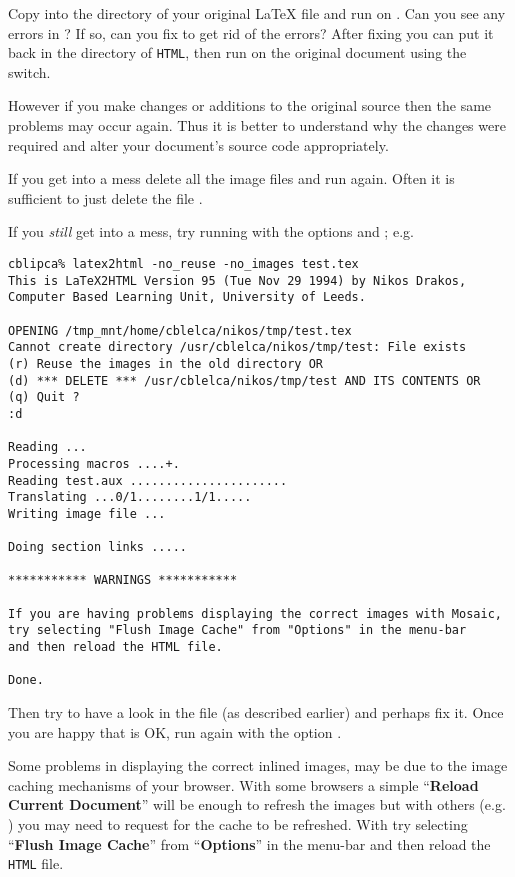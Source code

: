 \begin{htmllist}
Copy  into the directory
of your original \LaTeX{} file and run  on .
Can you see any errors in ?
If so, can you fix  to get rid of the errors?
After fixing 
you can put it back in the directory of \texttt{HTML},
then run \latextohtml{} on the original document
using the  switch.

However if you make changes or additions to the original source
then the same problems may occur again.
Thus it is better to understand why the changes were required
and alter your document's source code appropriately.

\medskip

If you get into a mess delete all the image files and run \latextohtml{}
again. Often it is sufficient to just delete the file .

If you \emph{still} get into a mess, try running \latextohtml{} with the options
 and ; e.g.
\begin{small}
\begin{verbatim}
cblipca% latex2html -no_reuse -no_images test.tex
This is LaTeX2HTML Version 95 (Tue Nov 29 1994) by Nikos Drakos,
Computer Based Learning Unit, University of Leeds.

OPENING /tmp_mnt/home/cblelca/nikos/tmp/test.tex
Cannot create directory /usr/cblelca/nikos/tmp/test: File exists
(r) Reuse the images in the old directory OR
(d) *** DELETE *** /usr/cblelca/nikos/tmp/test AND ITS CONTENTS OR
(q) Quit ?
:d

Reading ...
Processing macros ....+.
Reading test.aux ......................
Translating ...0/1........1/1.....
Writing image file ...

Doing section links .....

*********** WARNINGS ***********

If you are having problems displaying the correct images with Mosaic,
try selecting "Flush Image Cache" from "Options" in the menu-bar
and then reload the HTML file.

Done.
\end{verbatim}
\end{small}
Then try to have a look in the file  
(as described earlier) and perhaps fix it.
Once you are happy that  is OK, run \latextohtml{}
again with the option .

Some problems in displaying the correct inlined images,
may be due to the image caching mechanisms of your browser.
With some browsers a simple ``\textbf{Reload Current Document}'' will be enough
to refresh the images but with others (e.g. ) you may need
to request for the cache to be refreshed. With  try
selecting ``\textbf{Flush Image Cache}'' from ``\textbf{Options}'' in the menu-bar
and then reload the \texttt{HTML} file.



\end{htmllist}
